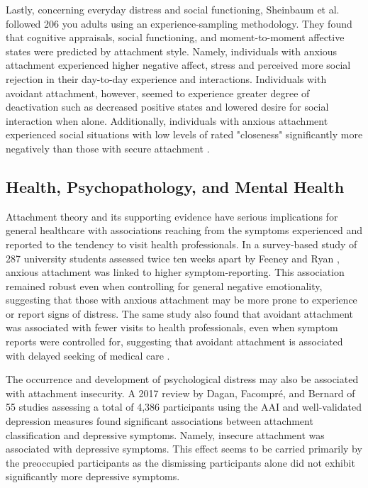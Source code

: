 \documentclass[12pt]{report}
\begin{document}
Lastly, concerning everyday distress and social functioning, Sheinbaum et al. \cite{Sheinbaum2015} followed 206 you adults using an experience-sampling methodology.
They found that cognitive appraisals, social functioning, and moment-to-moment affective states were predicted by attachment style.
Namely, individuals with anxious attachment experienced higher negative affect, stress and perceived more social rejection in their day-to-day experience and interactions. Individuals with avoidant attachment, however, seemed to experience greater degree of deactivation such as decreased positive states and lowered desire for social interaction when alone.
Additionally, individuals with anxious attachment experienced social situations with low levels of rated "closeness" significantly more negatively than those with secure attachment \cite{Sheinbaum2015}.

\subsection{Health, Psychopathology, and Mental Health}
Attachment theory and its supporting evidence have serious implications for general healthcare with associations reaching from the symptoms experienced and reported to the tendency to visit health professionals.
In a survey-based study of 287 university students assessed twice ten weeks apart by Feeney and Ryan \cite{Feeney1994}, anxious attachment was linked to higher symptom-reporting. This association remained robust even when controlling for general negative emotionality, suggesting that those with anxious attachment may be more prone to experience or report signs of distress.
The same study also found that avoidant attachment was associated with fewer visits to health professionals, even when symptom reports were controlled for, suggesting that avoidant attachment is associated with delayed seeking of medical care \cite{Feeney1994}.

The occurrence and development of psychological distress may also be associated with attachment insecurity. A 2017 review by Dagan, Facompré, and Bernard \cite{Dagan2018} of 55 studies assessing a total of 4,386 participants using the AAI and well-validated depression measures found significant associations between attachment classification and depressive symptoms.
Namely, insecure attachment was associated with depressive symptoms. This effect seems to be carried primarily by the preoccupied participants as the dismissing participants alone did not exhibit significantly more depressive symptoms.
\end{document}
